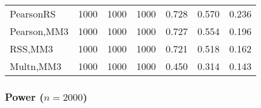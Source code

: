 \documentclass[
]{article}
\begin{document}
\begin{table}[H]
{\begin{tabular}[t]{lrrrrrr}
\hspace{1em}PearsonRS & 1000 & 1000 & 1000 & 0.728 & 0.570 & 0.236\\
\hspace{1em}Pearson,MM3 & 1000 & 1000 & 1000 & 0.727 & 0.554 & 0.196\\
\hspace{1em}RSS,MM3 & 1000 & 1000 & 1000 & 0.721 & 0.518 & 0.162\\
\hspace{1em}Multn,MM3 & 1000 & 1000 & 1000 & 0.450 & 0.314 & 0.143\\
\bottomrule
\end{tabular}}
\end{table}

\hypertarget{power-n2000-2}{%
\subsubsection{\texorpdfstring{Power
(\(n=2000\))}{Power (n=2000)}}\label{power-n2000-2}}
\end{document}
